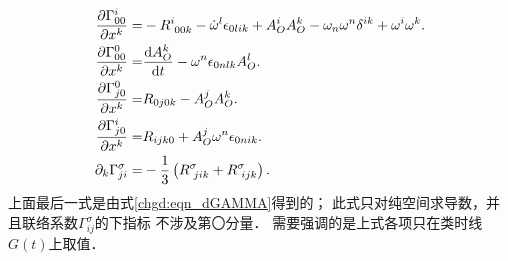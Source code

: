 \begin{subequations}\label{chfd:eqn_dGamma-2nd} 
\begin{align}
    \frac{\partial \Gamma_{00}^i}{\partial x^k}
    =& -R_{\hphantom{i} 00k}^i - \dot{\omega}^l \epsilon_{0lik} + A_{O}^i A_{O}^k
    - \omega_n \omega^n \delta^{ik} + \omega^i \omega^k . \\
    \frac{\partial \Gamma_{0 0}^0}{\partial x^k}
    = & \frac{{\rm d}A_{O}^k}{{\rm d}t} - \omega^n \epsilon_{0nlk} A_{O}^l . \\
    \frac{\partial \Gamma_{j 0}^0}{\partial x^k}
    =& R_{0 j 0 k} - A_{O}^j A_{O}^k . \\
    \frac{\partial \Gamma_{j 0}^i}{\partial x^k}
    =& R_{i j k 0} + A_{O}^j \omega^n \epsilon_{0nik} . \\
    \partial_k {\Gamma}_{ji}^{\sigma} =& -\frac{1}{3}\left(
    {R}_{\hphantom{i} jik}^\sigma +{R}_{\hphantom{i} ijk}^\sigma \right).
\end{align}
\end{subequations}
上面最后一式是由式\eqref{chgd:eqn_dGAMMA}得到的；
此式只对纯空间求导数，并且联络系数$\Gamma^\sigma_{ij}$的下指标
不涉及第〇分量．
需要强调的是上式各项只在类时线$G(t)$上取值．


